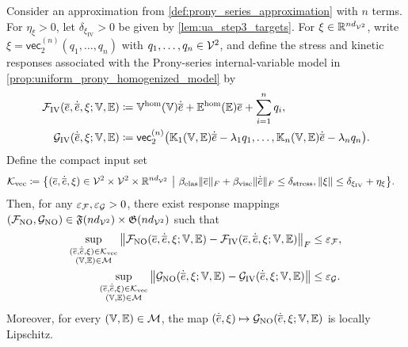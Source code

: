\begin{lemma}\label{lem:ua_step3_no}
{{\color{blue}Consider an approximation from \cref{def:prony_series_approximation} with $n$ terms}. For $\eta_{\xi}>0$, let} $\delta_{\xi_{\mathrm{IV}}}>0$ be given by \cref{lem:ua_step3_targets}. For $\xi\in\mathbb{R}^{nd_{{\mathcal{V}}^2}}$, write $\xi=\mathsf{vec}_2^{(n)}(q_1,\dots,q_n)$ with $q_1,\dots,q_n\in{\mathcal{V}}^2$, and define the stress and kinetic responses associated with the Prony-series internal-variable model in \cref{prop:uniform_prony_homogenized_model} by
\begin{align*}
{\mathcal{F}}_{\mathrm{IV}}(\overline{e},\dot{\overline{e}},\xi;\mathbb{V},\mathbb{E})
&\coloneqq
\mathbb{V}^{\rm hom}(\mathbb{V})\dot{\overline{e}}
+\mathbb{E}^{\rm hom}(\mathbb{E})\overline{e}
+\sum_{i=1}^{n} q_i,\\
{\mathcal{G}}_{\mathrm{IV}}(\dot{\overline{e}},\xi;\mathbb{V},\mathbb{E})
&\coloneqq
\mathsf{vec}_2^{(n)}\big(\mathbb{K}_1(\mathbb{V},\mathbb{E})\dot{\overline{e}}-\lambda_1 q_1,\dots,
\mathbb{K}_n(\mathbb{V},\mathbb{E})\dot{\overline{e}}-\lambda_n q_n\big).
\end{align*}
{Define the compact input set
\begin{equation*}
\begin{aligned}
{\mathcal{K}}_{\rm vec}\coloneqq\bigl\{(\overline e,\dot{\overline e},\xi)\in{\mathcal{V}}^2\times{\mathcal{V}}^2\times\mathbb{R}^{nd_{{\mathcal{V}}^2}}\ \big|\ &\beta_{\rm elas}\|\overline e\|_F+\beta_{\rm visc}\|\dot{\overline e}\|_F\le\delta_{\rm stress},\|\xi\|\le\delta_{\xi_{\rm IV}}+\eta_\xi\bigr\}.
\end{aligned}
\end{equation*}
}
Then, for any $\varepsilon_{{\mathcal{F}}},\varepsilon_{{\mathcal{G}}}>0$, there exist response mappings $({\mathcal{F}}_{\mathrm{NO}},{\mathcal{G}}_{\mathrm{NO}})\in \mathfrak{F}(nd_{{\mathcal{V}}^2})\times \mathfrak{G}(nd_{{\mathcal{V}}^2})$ such that
    \begin{align}
    \sup_{\substack{(\overline e,\dot{\overline e},\xi)\in {\mathcal{K}}_{\mathrm{vec}}\\(\mathbb{V},\mathbb{E})\in {\mathcal{M}}}}
    \left\|{\mathcal{F}}_{\mathrm{NO}}(\overline e,\dot{\overline e},\xi;\mathbb{V},\mathbb{E})-{\mathcal{F}}_{\mathrm{IV}}(\overline e,\dot{\overline e},\xi;\mathbb{V},\mathbb{E})\right\|_F
    &\leq \varepsilon_{{\mathcal{F}}},\label{eq:ua_full_F_approx}\\
    \sup_{\substack{(\overline e,\dot{\overline e},\xi)\in {\mathcal{K}}_{\mathrm{vec}}\\(\mathbb{V},\mathbb{E})\in {\mathcal{M}}}}
    \left\|{\mathcal{G}}_{\mathrm{NO}}(\dot{\overline e},\xi;\mathbb{V},\mathbb{E})-{\mathcal{G}}_{\mathrm{IV}}(\dot{\overline e},\xi;\mathbb{V},\mathbb{E})\right\|
    &\leq \varepsilon_{{\mathcal{G}}}.\label{eq:ua_full_G_approx}
    \end{align}
Moreover, for every $(\mathbb{V},\mathbb{E})\in{\mathcal{M}}$, the map $(\dot{\overline e},\xi)\mapsto {\mathcal{G}}_{\mathrm{NO}}(\dot{\overline e},\xi;\mathbb{V},\mathbb{E})$ is locally Lipschitz.
\end{lemma}


